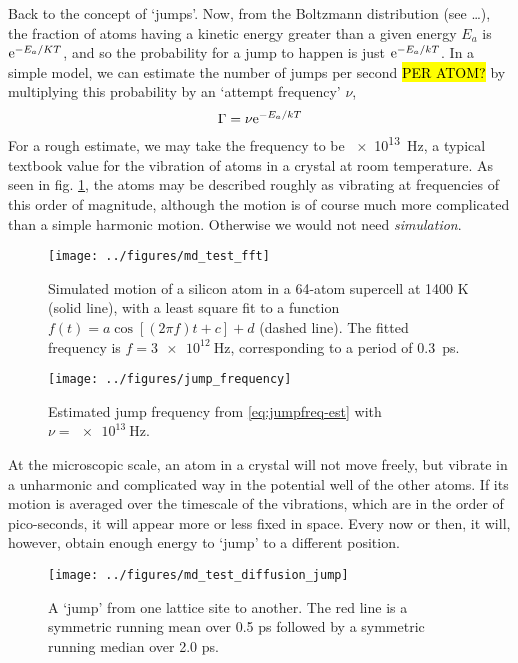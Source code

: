 \documentclass[11pt,bibliography=totoc,index=totoc]{scrbook}   %
\newcommand{\comment}[1]{\hl{#1}}
\begin{document}
Back to the concept of `jumps'. Now, from the Boltzmann distribution (see \ldots), the fraction of atoms having a kinetic energy greater than a given energy $E_a$ is $\mathrm{e}^{-E_a/KT}$, and so the probability for a jump to happen is just $\mathrm{e}^{-E_a/kT}$. 
In a simple model, we can estimate the number of jumps per second \comment{PER ATOM?} by multiplying this probability by an `attempt frequency' $\nu$,
\begin{equation}
  \Gamma = \nu \mathrm{e}^{-E_a/kT}
  \label{eq:jumpfreq-est}
\end{equation}
For a rough estimate, we may take the frequency to be \SI{e13}{\hertz}, a typical textbook value for the vibration of atoms in a crystal at room temperature.
As seen in fig. \ref{fig:simple-vibration}, the atoms may be described roughly as vibrating at frequencies of this order of magnitude, although the motion is of course much more complicated than a simple harmonic motion. Otherwise we would not need \emph{simulation}.

\begin{figure}[htbp]
  \begin{center}
    \texttt{[image: ../figures/md\_test\_fft]}
  \end{center}
  \caption{
    Simulated motion of a silicon atom in a 64-atom supercell at 1400 K (solid line), 
    with a least square fit to a function $f(t) = a \cos[(2\pi f)t + c] + d$ (dashed line). 
    The fitted frequency is $f=\SI{3e12}{\hertz}$, corresponding to a period of 0.3~ps.
  }
  \label{fig:simple-vibration}
\end{figure}

\begin{figure}[htbp]
  \begin{center}
    \texttt{[image: ../figures/jump\_frequency]}
  \end{center}
  \caption{Estimated jump frequency from \eqref{eq:jumpfreq-est} with $\nu=\SI{e13}{\hertz}$.}
  \label{fig:jumpfreq-est}
\end{figure}




At the microscopic scale, an atom in a crystal will not move freely, but vibrate in a unharmonic and complicated way in the potential well of the other atoms. 
If its motion is averaged over the timescale of the vibrations, which are in the order of pico-seconds, it will appear more or less fixed in space. 
Every now or then, it will, however, obtain enough energy to `jump' to a different position.

\begin{figure}[htbp]
  \begin{center}
    \texttt{[image: ../figures/md\_test\_diffusion\_jump]}
  \end{center}
  \caption{A `jump' from one lattice site to another. The red line is a symmetric running mean over 0.5 ps followed by a symmetric running median over 2.0 ps.}
  \label{fig:../figures/md_test_diffusion_jump}
\end{figure}
\end{document}
